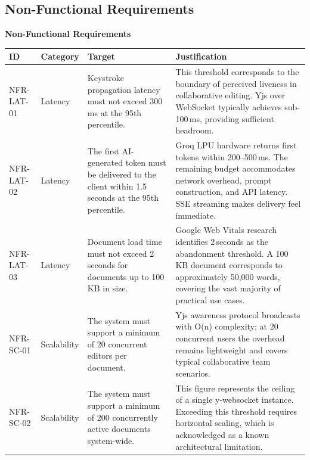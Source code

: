 \documentclass{article}
\begin{document}
\newpage
\subsection{Non-Functional Requirements}
\noindent\textbf{Non-Functional Requirements}
\vspace{5pt}

\noindent
{\small
\begin{tabularx}{\textwidth}{|>{\hsize=0.3\hsize\raggedright\arraybackslash}X|>{\hsize=0.3\hsize\raggedright\arraybackslash}X|>{\hsize=1\hsize\raggedright\arraybackslash}X|>{\hsize=1.4\hsize\raggedright\arraybackslash}X|}
    \hline
    \rowcolor{tableBlue} 
    \textbf{\color{white}ID} & 
    \textbf{\color{white}Category} & 
    \textbf{\color{white}Target} & 
    \textbf{\color{white}Justification} \\
    \hline
    NFR-LAT-01 & Latency &
    Keystroke propagation latency must not exceed 300\,ms at the 95th percentile. &
    This threshold corresponds to the boundary of perceived liveness in collaborative editing. Yjs over WebSocket typically achieves sub-100\,ms, providing sufficient headroom. \\
    \hline
    NFR-LAT-02 & Latency &
    The first AI-generated token must be delivered to the client within 1.5\,seconds at the 95th percentile. &
    Groq LPU hardware returns first tokens within 200--500\,ms. The remaining budget accommodates network overhead, prompt construction, and API latency. SSE streaming makes delivery feel immediate. \\
    \hline
    NFR-LAT-03 & Latency &
    Document load time must not exceed 2\,seconds for documents up to 100\,KB in size. &
    Google Web Vitals research identifies 2\,seconds as the abandonment threshold. A 100\,KB document corresponds to approximately 50,000 words, covering the vast majority of practical use cases. \\
    \hline
    NFR-SC-01 & Scalability &
    The system must support a minimum of 20 concurrent editors per document. &
    Yjs awareness protocol broadcasts with O(n) complexity; at 20 concurrent users the overhead remains lightweight and covers typical collaborative team scenarios. \\
    \hline
    NFR-SC-02 & Scalability &
    The system must support a minimum of 200 concurrently active documents system-wide. &
    This figure represents the ceiling of a single y-websocket instance. Exceeding this threshold requires horizontal scaling, which is acknowledged as a known architectural limitation. \\

\end{tabularx}}
\end{document}
